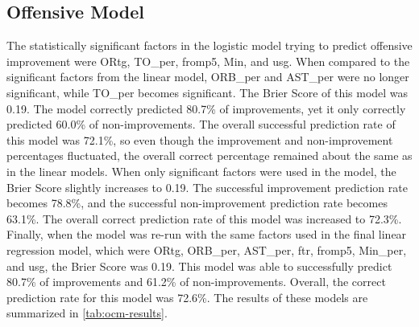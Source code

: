 \documentclass[12pt]{article}
\begin{document}
\subsection{Offensive Model}
\label{subsec:ocm}
The statistically significant factors in the logistic model trying to predict offensive improvement were ORtg, TO\_per, fromp5, Min\per, and usg. When compared to the significant factors from the  linear model, ORB\_per and AST\_per were no longer significant, while TO\_per becomes significant. The Brier Score of this model was 0.19. The model correctly predicted 80.7\% of improvements, yet it only correctly predicted 60.0\% of non-improvements. The overall successful prediction rate of this model was 72.1\%, so even though the improvement and non-improvement percentages fluctuated, the overall correct percentage remained about the same as in the linear models. When only significant factors were used in the model, the Brier Score slightly increases to 0.19. The successful improvement prediction rate becomes 78.8\%, and the successful non-improvement prediction rate becomes 63.1\%. The overall correct prediction rate of this model was increased to 72.3\%. Finally, when the model was re-run with the same factors used in the final linear regression model, which were ORtg, ORB\_per, AST\_per, ftr, fromp5, Min_per, and usg, the Brier Score was 0.19. This model was able to successfully predict 80.7\% of improvements and 61.2\% of non-improvements. Overall, the correct prediction rate for this model was 72.6\%. The results of these models are summarized in \autoref{tab:ocm-results}.

\begin{table}[tbp]
\caption{Offensive Classification Model Evaluators}
\centering
{}
\label{tab:ocm-results}
\end{table}
\end{document}
